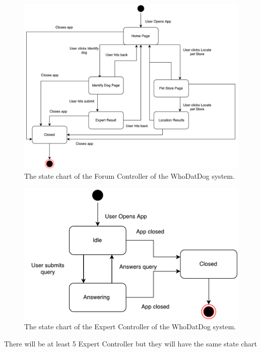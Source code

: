 \documentclass[]{article}
\begin{document}
\begin{figure}[H]
	\centering
	\includegraphics[width=\textwidth]{ForumController.pdf}
	\caption{\label{fig:analysisclassdiagram}The state chart of the Forum Controller of the WhoDatDog system.}
\end{figure}

\begin{figure}[H]
	\centering
	\includegraphics[width=\textwidth]{ExpertController.pdf}
	\caption{\label{fig:analysisclassdiagram}The state chart of the Expert Controller of the WhoDatDog system.}
\end{figure}

There will be at least  5 Expert Controller but they will have the same state chart
\end{document}
